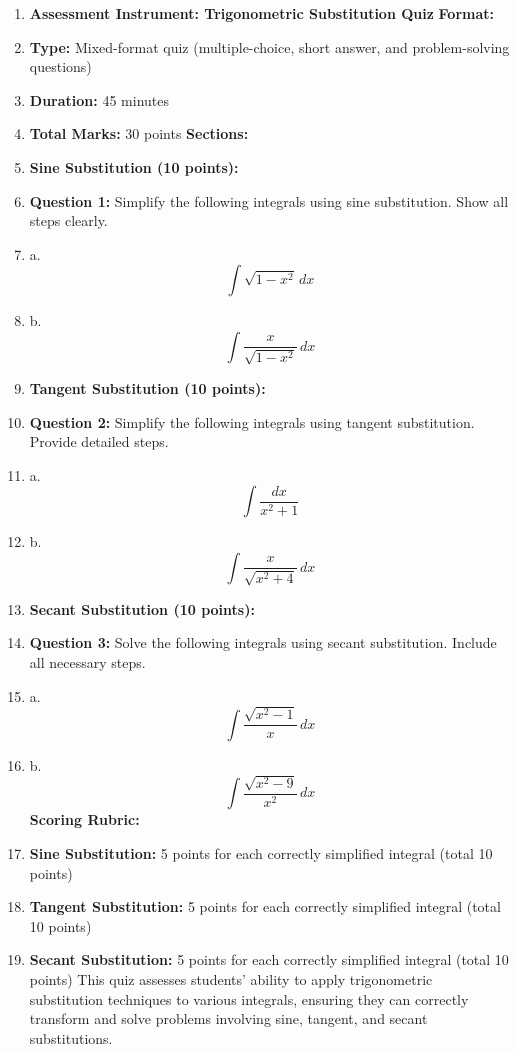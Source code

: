 \begin{enumerate}
    \item \textbf{Assessment Instrument: Trigonometric Substitution Quiz} \textbf{Format:}
    \item \textbf{Type:} Mixed-format quiz (multiple-choice, short answer, and problem-solving questions)
    \item \textbf{Duration:} 45 minutes
    \item \textbf{Total Marks:} 30 points \textbf{Sections:}
    \item \textbf{Sine Substitution (10 points):}
    \item \textbf{Question 1:} Simplify the following integrals using sine substitution. Show all steps clearly.
    \item a. $$\int \sqrt{1 - x^2} \, dx$$
    \item b. $$\int \frac{x}{\sqrt{1 - x^2}} \, dx$$
    \item \textbf{Tangent Substitution (10 points):}
    \item \textbf{Question 2:} Simplify the following integrals using tangent substitution. Provide detailed steps.
    \item a. $$\int \frac{dx}{x^2 + 1}$$
    \item b. $$\int \frac{x}{\sqrt{x^2 + 4}} \, dx$$
    \item \textbf{Secant Substitution (10 points):}
    \item \textbf{Question 3:} Solve the following integrals using secant substitution. Include all necessary steps.
    \item a. $$\int \frac{\sqrt{x^2 - 1}}{x} \, dx$$
    \item b. $$\int \frac{\sqrt{x^2 - 9}}{x^2} \, dx$$ \textbf{Scoring Rubric:}
    \item \textbf{Sine Substitution:} 5 points for each correctly simplified integral (total 10 points)
    \item \textbf{Tangent Substitution:} 5 points for each correctly simplified integral (total 10 points)
    \item \textbf{Secant Substitution:} 5 points for each correctly simplified integral (total 10 points) This quiz assesses students' ability to apply trigonometric substitution techniques to various integrals, ensuring they can correctly transform and solve problems involving sine, tangent, and secant substitutions.
\end{enumerate}

